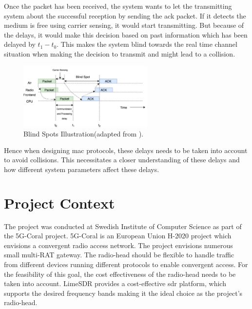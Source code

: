 Once the packet has been received, the system wants to let the transmitting system about the successful reception by sending the \ac{ack} packet. If it detects the medium is free using carrier sensing, it would start transmitting.
But because of the delays, it would make this decision based on past information which has been delayed by $t_1 - t_0$.
This makes the system blind towards the real time channel situation when making the decision to transmit and might lead to a collision. \\ 

\begin{figure}[!h]
\centering
\includegraphics[width=0.6\textwidth]{Figure/BlindSpots.png}
\caption{Blind Spots Illustration(adapted from \cite{schmid_experimental_2007}).}
\label{blind_spots}
\end{figure}

Hence when designing \ac{mac} protocols, these delays needs to be taken into account to avoid collisions.
This necessitates a closer understanding of these delays and how different system parameters affect these delays.



\section{Project Context}

The project was conducted at Swedish Institute of Computer Science as part of the 5G-Coral project.
5G-Coral is an European Union H-2020 project which envisions a convergent radio access network.
The project envisions numerous small multi-\ac{RAT} gateway.
The radio-head should be flexible to handle traffic from different devices running different protocols to enable convergent access.
For the feasibility of this goal, the cost effectiveness of the radio-head needs to be taken into account.
LimeSDR \cite{noauthor_limesdr_nodate} provides a cost-effective \ac{sdr} platform, which supports the desired frequency bands making it the ideal choice as the project's radio-head.\\

